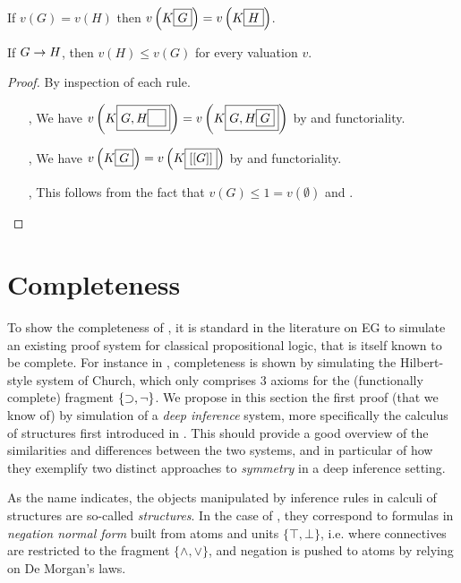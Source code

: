 \begin{corollary}[Functoriality]\label{cor:eg-functoriality}
  If $v(G) = v(H)$ then $v\left(K\fbox{$G$}\right) = v\left(K\fbox{$H$}\right)$.
\end{corollary}

\begin{theorem}[Soundness]
  If $G \rightarrow H$, then $v(H) \leq v(G)$ for every valuation $v$.
\end{theorem}
\begin{proof}
  By inspection of each rule.
  \begin{itemize}
    \item[\rsf{Iter}, \rsf{Deit}] We have $v\left(K\fbox{$G,
    H\fbox{$\phantom{G}$}$}\right) = v\left(K\fbox{$G, H\fbox{$G$}$}\right)$ by
     and functoriality.

    \item[\rsf{Dcut{\da}}, \rsf{Dcut{\ua}}] We have
    $v\left(K\fbox{$G$}\right) = v\left(K\fbox{$[[G]]$}\right)$ by
     and functoriality.

    \item[\rsf{Ins}, \rsf{Del}] This follows from the fact that $v(G) \leq 1 =
    v(\emptyset)$ and .
  \end{itemize}
\end{proof}

\section{Completeness}

To show the completeness of , it is standard in the literature on EG
to simulate an existing proof system for classical propositional logic, that is
itself known to be complete. For instance in \cite{Roberts+1973}, completeness
is shown by simulating the Hilbert-style system  of Church, which only
comprises 3 axioms for the (functionally complete) fragment $\{\supset, \neg\}$.
We propose in this section the first proof (that we know of) by simulation of a
\emph{deep inference} system, more specifically the calculus of structures
 first introduced in . This should
provide a good overview of the similarities and differences between the two
systems, and in particular of how they exemplify two distinct approaches to
\emph{symmetry} in a deep inference setting.

As the name indicates, the objects manipulated by inference rules in calculi of
structures are so-called \emph{structures}. In the case of , they
correspond to formulas in \emph{negation normal form} built from atoms and units
$\{\top, \bot\}$, i.e. where connectives are restricted to the fragment
$\{\land, \lor\}$, and negation is pushed to atoms by relying on De Morgan's
laws.


